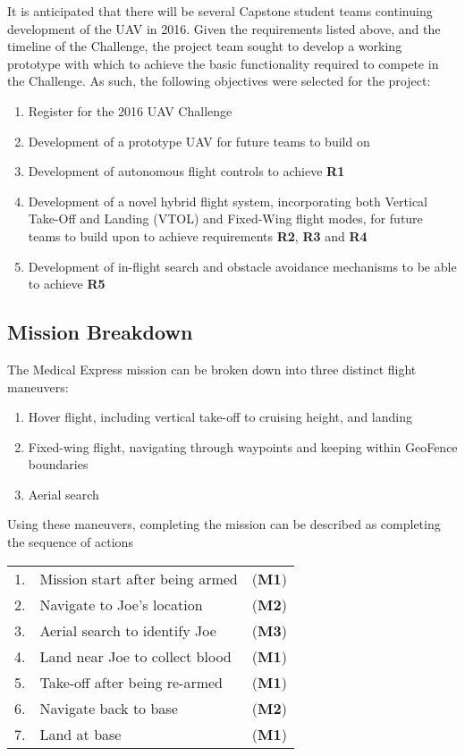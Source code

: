 It is anticipated that there will be several Capstone student teams continuing development of the UAV in 2016. Given the requirements listed above, and the timeline of the Challenge, the \ID project team sought to develop a working prototype with which to achieve the basic functionality required to compete in the Challenge. As such, the following objectives were selected for the project:
\begin{enumerate}[label=\bfseries O\arabic*:] \itemsep-2pt
	\item Register for the 2016 UAV Challenge
	\item Development of a prototype UAV for future teams to build on
	\item Development of autonomous flight controls to achieve \textbf{R1}
	\item Development of a novel hybrid flight system, incorporating both Vertical Take-Off and Landing (VTOL) and Fixed-Wing flight modes, for future teams to build upon to achieve requirements \textbf{R2}, \textbf{R3} and \textbf{R4}
	\item Development of in-flight search and obstacle avoidance mechanisms to be able to achieve \textbf{R5}
\end{enumerate}

\subsection{Mission Breakdown}
\label{sec:flightmaneuvers_exec}
The Medical Express mission can be broken down into three distinct flight maneuvers:
\begin{enumerate}[label=\bfseries M\arabic*:] \itemsep-2pt
	\item Hover flight, including vertical take-off to cruising height, and landing
	\item Fixed-wing flight, navigating through waypoints and keeping within GeoFence boundaries
	\item Aerial search
\end{enumerate}

Using these maneuvers, completing the mission can be described as completing the sequence of actions\\
\begin{tabular}{r l l}
	1. & Mission start after being armed & (\textbf{M1}) \\ 
	2. & Navigate to Joe's location & (\textbf{M2}) \\ 
	3. & Aerial search to identify Joe & (\textbf{M3}) \\ 
	4. & Land near Joe to collect blood & (\textbf{M1}) \\ 
	5. & Take-off after being re-armed & (\textbf{M1}) \\ 
	6. & Navigate back to base & (\textbf{M2}) \\ 
	7. & Land at base & (\textbf{M1}) \\ 
\end{tabular}\\

